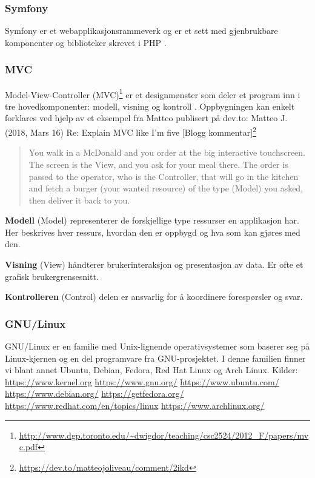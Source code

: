 \subsubsection{Symfony}
\label{sec:tools-symfony}
Symfony er et webapplikasjonsrammeverk og er et sett med gjenbrukbare komponenter og biblioteker skrevet i PHP \cite{symfony19wis}. 

\subsubsection{MVC}
\label{sec:tools-mvc}
Model-View-Controller (MVC)\footnote{\url{http://www.dgp.toronto.edu/~dwigdor/teaching/csc2524/2012_F/papers/mvc.pdf}} er et designmønster som deler et program inn i tre hovedkomponenter: modell, visning og kontroll \cite{burbeck87aps}. Oppbygningen kan enkelt forklares ved hjelp av et eksempel fra Matteo publisert på dev.to:
Matteo J. (2018, Mars 16) Re: Explain MVC like I'm five [Blogg kommentar]\footnote{\url{https://dev.to/matteojoliveau/comment/2ikd}}
\begin{quote}
    You walk in a McDonald and you order at the big interactive touchscreen.
    The screen is the View, and you ask for your meal there.
    The order is passed to the operator, who is the Controller, that will go in the kitchen and fetch a burger (your wanted resource) of the type (Model) you asked, then deliver it back to you.
\end{quote}

\textbf{Modell} (Model) representerer de forskjellige type ressurser en applikasjon har. Her beskrives hver ressurs, hvordan den er oppbygd og hva som kan gjøres med den.

\textbf{Visning} (View) håndterer brukerinteraksjon og presentasjon av data. Er ofte et grafisk brukergrensesnitt.

\textbf{Kontrolleren} (Control) delen er ansvarlig for å koordinere forespørsler og svar.

\subsubsection{GNU/Linux}
GNU/Linux er en familie med Unix-lignende operativsystemer som baserer seg på Linux-kjernen og en del programvare fra GNU-prosjektet.
I denne familien finner vi blant annet Ubuntu, Debian, Fedora, Red Hat Linux og Arch Linux.
Kilder: \url{https://www.kernel.org} \url{https://www.gnu.org/} \url{https://www.ubuntu.com/} \url{https://www.debian.org/} \url{https://getfedora.org/} \url{https://www.redhat.com/en/topics/linux} \url{https://www.archlinux.org/}

